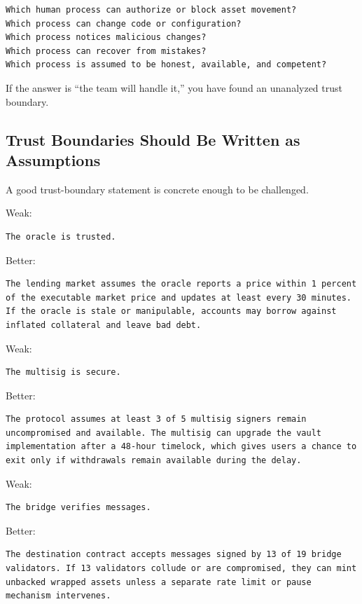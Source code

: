 \begin{lstlisting}
Which human process can authorize or block asset movement?
Which process can change code or configuration?
Which process notices malicious changes?
Which process can recover from mistakes?
Which process is assumed to be honest, available, and competent?
\end{lstlisting}

If the answer is ``the team will handle it,'' you have found an
unanalyzed trust boundary.

\subsection{Trust Boundaries Should Be Written as Assumptions}

A good trust-boundary statement is concrete enough to be challenged.

Weak:

\begin{lstlisting}
The oracle is trusted.
\end{lstlisting}

Better:

\begin{lstlisting}
The lending market assumes the oracle reports a price within 1 percent of the executable market price and updates at least every 30 minutes. If the oracle is stale or manipulable, accounts may borrow against inflated collateral and leave bad debt.
\end{lstlisting}

Weak:

\begin{lstlisting}
The multisig is secure.
\end{lstlisting}

Better:

\begin{lstlisting}
The protocol assumes at least 3 of 5 multisig signers remain uncompromised and available. The multisig can upgrade the vault implementation after a 48-hour timelock, which gives users a chance to exit only if withdrawals remain available during the delay.
\end{lstlisting}

Weak:

\begin{lstlisting}
The bridge verifies messages.
\end{lstlisting}

Better:

\begin{lstlisting}
The destination contract accepts messages signed by 13 of 19 bridge validators. If 13 validators collude or are compromised, they can mint unbacked wrapped assets unless a separate rate limit or pause mechanism intervenes.
\end{lstlisting}

